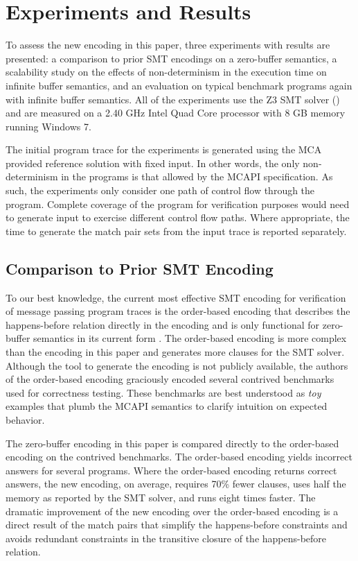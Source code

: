 \section{Experiments and Results}
To assess the new encoding in this paper, three experiments with
results are presented: a comparison to prior SMT encodings on a
zero-buffer semantics, a scalability study on the effects of
non-determinism in the execution time on infinite buffer semantics,
and an evaluation on typical benchmark programs again with infinite
buffer semantics. All of the experiments use the Z3 SMT solver
(\cite{demoura:tacas08}) and are measured on a 2.40 GHz Intel Quad
Core processor with 8 GB memory running Windows 7.

The initial program trace for the experiments is generated using the
MCA provided reference solution with fixed input. In other words, the
only non-determinism in the programs is that allowed by the MCAPI
specification. As such, the experiments only consider
one path of control flow through the program. Complete coverage of the
program for verification purposes would need to generate input to
exercise different control flow paths.  Where appropriate, the time to
generate the match pair sets from the input trace is reported
separately.

\subsection{Comparison to Prior SMT Encoding}
To our best knowledge, the current most effective SMT encoding for
verification of message passing program traces is the order-based
encoding that describes the happens-before relation directly in the
encoding and is only functional for zero-buffer semantics in its
current form \cite{elwakil:padtad10}. The order-based encoding is more complex than the encoding in this paper and  generates more clauses for the SMT solver.  Although the tool to generate
the encoding is not publicly available, the authors of the order-based
encoding graciously encoded several contrived benchmarks used for
correctness testing. These benchmarks are best understood as
\emph{toy} examples that plumb the MCAPI semantics to clarify
intuition on expected behavior.

The zero-buffer encoding in this paper is compared directly to the
order-based encoding on the contrived benchmarks. The order-based
encoding yields incorrect answers for several programs. Where the
order-based encoding returns correct answers, the new encoding, on
average, requires 70\% fewer clauses, uses half the memory as reported
by the SMT solver, and runs eight times faster. The dramatic
improvement of the new encoding over the order-based encoding is a
direct result of the match pairs that simplify the happens-before
constraints and avoids redundant constraints in the transitive closure
of the happens-before relation.

